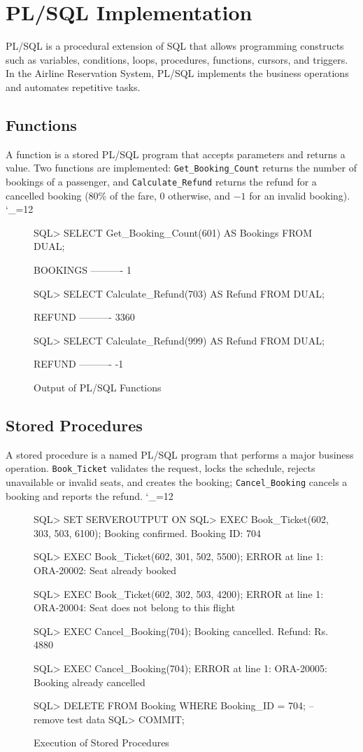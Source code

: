 \documentclass[12pt,a4paper]{article}
\newcommand{\sqlfile}{\begingroup\catcode`\_=12 \sqlfileA}
\newcommand{\sqlfileA}[1]{\endgroup}
\begin{document}
\section{PL/SQL Implementation}
PL/SQL is a procedural extension of SQL that allows programming constructs such as variables, conditions,
loops, procedures, functions, cursors, and triggers. In the Airline Reservation System, PL/SQL implements
the business operations and automates repetitive tasks.

\subsection{Functions}
A function is a stored PL/SQL program that accepts parameters and returns a value. Two functions are
implemented: \texttt{Get\_Booking\_Count} returns the number of bookings of a passenger, and
\texttt{Calculate\_Refund} returns the refund for a cancelled booking (80\% of the fare, 0 otherwise, and
$-1$ for an invalid booking).
\sqlfile{04_functions.sql}
\begin{figure}[H]
\begin{terminal}
SQL> SELECT Get_Booking_Count(601) AS Bookings FROM DUAL;

  BOOKINGS
----------
         1

SQL> SELECT Calculate_Refund(703) AS Refund FROM DUAL;

    REFUND
----------
      3360

SQL> SELECT Calculate_Refund(999) AS Refund FROM DUAL;

    REFUND
----------
        -1
\end{terminal}
\caption{Output of PL/SQL Functions}
\end{figure}

\subsection{Stored Procedures}
A stored procedure is a named PL/SQL program that performs a major business operation.
\texttt{Book\_Ticket} validates the request, locks the schedule, rejects unavailable or invalid seats, and
creates the booking; \texttt{Cancel\_Booking} cancels a booking and reports the refund.
\sqlfile{05_procedures.sql}
\begin{figure}[H]
\begin{terminal}
SQL> SET SERVEROUTPUT ON
SQL> EXEC Book_Ticket(602, 303, 503, 6100);
Booking confirmed. Booking ID: 704

SQL> EXEC Book_Ticket(602, 301, 502, 5500);
ERROR at line 1:
ORA-20002: Seat already booked

SQL> EXEC Book_Ticket(602, 302, 503, 4200);
ERROR at line 1:
ORA-20004: Seat does not belong to this flight

SQL> EXEC Cancel_Booking(704);
Booking cancelled. Refund: Rs. 4880

SQL> EXEC Cancel_Booking(704);
ERROR at line 1:
ORA-20005: Booking already cancelled

SQL> DELETE FROM Booking WHERE Booking_ID = 704;   -- remove test data
SQL> COMMIT;
\end{terminal}
\caption{Execution of Stored Procedures}
\end{figure}
\end{document}
